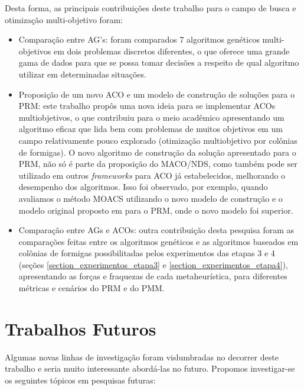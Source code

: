 Desta forma, as principais contribuições deste trabalho para o campo de busca e otimização multi-objetivo foram:

\begin{itemize}
	\item Comparação entre AG's: foram comparados 7 algoritmos genéticos multi-objetivos em dois problemas discretos diferentes, o que oferece uma grande gama de dados para que se possa tomar decisões a respeito de qual algoritmo utilizar em determinadas situações.
	\item Proposição de um novo ACO e um modelo de construção de soluções para o PRM: este trabalho propôs uma nova ideia para se implementar ACOs multiobjetivos, o que contribuiu para o meio acadêmico apresentando um algoritmo eficaz que lida bem com problemas de muitos objetivos em um campo relativamente pouco explorado (otimização multiobjetivo por colônias de formigas). O novo algoritmo de construção da solução apresentado para o PRM, não só é parte da proposição do MACO/NDS, como também pode ser utilizado em outros \textit{frameworks} para ACO já estabelecidos, melhorando o desempenho dos algoritmos. Isso foi observado, por exemplo, quando avaliamos o método MOACS utilizando o novo modelo de construção e o modelo original proposto em \cite{Riveros2016} para o PRM, onde o novo modelo foi superior.
	\item Comparação entre AGs e ACOs: outra contribuição desta pesquisa foram as comparações feitas entre os algoritmos genéticos e as algoritmos baseados em colônias de formigas possibilitadas pelos experimentos das etapas 3 e 4 (seções \ref{section_experimentos_etapa3} e \ref{section_experimentos_etapa4}), apresentando as forças e fraquezas de cada metaheurística, para diferentes métricas e cenários do PRM e do PMM.
\end{itemize}

\section{Trabalhos Futuros}
Algumas novas linhas de investigação foram vislumbradas no decorrer deste trabalho e seria muito interessante abordá-las no futuro. Propomos investigar-se os seguintes tópicos em pesquisas futuras:

